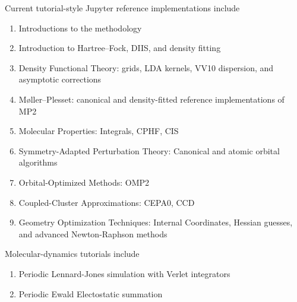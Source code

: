 

Current tutorial-style Jupyter reference implementations include

\begin{enumerate}
\item Introductions to the \pfn methodology
\item Introduction to Hartree--Fock, DIIS, and density fitting
\item Density Functional Theory: grids, LDA kernels, VV10 dispersion, and asymptotic corrections
\item M\o ller--Plesset: canonical and density-fitted reference implementations of MP2
\item Molecular Properties: Integrals, CPHF, CIS
\item Symmetry-Adapted Perturbation Theory: Canonical and atomic orbital algorithms
\item Orbital-Optimized Methods: OMP2
\item Coupled-Cluster Approximations: CEPA0, CCD
\item  Geometry Optimization Techniques: Internal Coordinates, Hessian guesses, and advanced Newton-Raphson methods
\end{enumerate}
Molecular-dynamics tutorials include
\begin{enumerate}
\item Periodic Lennard-Jones simulation with Verlet integrators
\item Periodic Ewald Electostatic summation
\end{enumerate}

